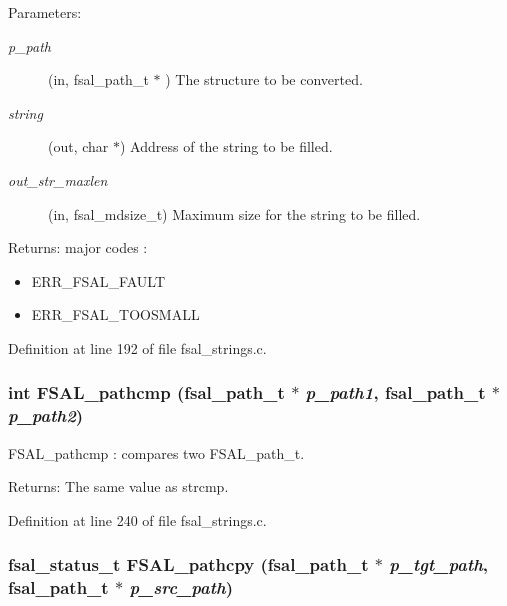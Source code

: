 \begin{Desc}
\item[Parameters:]
\begin{description}
\item[{\em p\_\-path}](in, fsal\_\-path\_\-t $\ast$ ) The structure to be converted. \item[{\em string}](out, char $\ast$) Address of the string to be filled. \item[{\em out\_\-str\_\-maxlen}](in, fsal\_\-mdsize\_\-t) Maximum size for the string to be filled.\end{description}
\end{Desc}
\begin{Desc}
\item[Returns:]major codes :\begin{itemize}
\item ERR\_\-FSAL\_\-FAULT\item ERR\_\-FSAL\_\-TOOSMALL \end{itemize}
\end{Desc}


Definition at line 192 of file fsal\_\-strings.c.
\subsubsection[{FSAL\_\-pathcmp}]{\setlength{\rightskip}{0pt plus 5cm}int FSAL\_\-pathcmp (fsal\_\-path\_\-t $\ast$ {\em p\_\-path1}, \/  fsal\_\-path\_\-t $\ast$ {\em p\_\-path2})}\label{group__FSALNameFunctions_gb505ff741d63869104f421803e18327d}


FSAL\_\-pathcmp : compares two FSAL\_\-path\_\-t.

\begin{Desc}
\item[Returns:]The same value as strcmp. \end{Desc}


Definition at line 240 of file fsal\_\-strings.c.
\subsubsection[{FSAL\_\-pathcpy}]{\setlength{\rightskip}{0pt plus 5cm}fsal\_\-status\_\-t FSAL\_\-pathcpy (fsal\_\-path\_\-t $\ast$ {\em p\_\-tgt\_\-path}, \/  fsal\_\-path\_\-t $\ast$ {\em p\_\-src\_\-path})}\label{group__FSALNameFunctions_g643b6638c1334c96bc763b195d1cf151}


